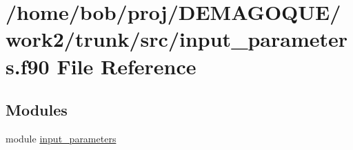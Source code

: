 \hypertarget{input__parameters_8f90}{
\section{/home/bob/proj/DEMAGOQUE/work2/trunk/src/input\_\-parameters.f90 File Reference}
\label{input__parameters_8f90}
}
\subsection*{Modules}
\begin{DoxyCompactItemize}
\item 
module \hyperlink{namespaceinput__parameters}{input\_\-parameters}
\end{DoxyCompactItemize}
